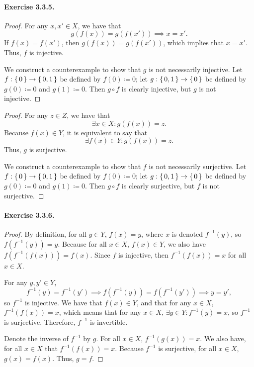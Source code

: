 \paragraph{Exercise 3.3.5.}
\begin{proof}
    For any $x,x'\in X$, we have that \[ g(f(x))=g(f(x')) \implies x = x' .\] If $f(x)=f(x')$, then $g(f(x))=g(f(x'))$, which implies that $x=x'$. Thus, $f$ is injective. 
    
    We construct a counterexample to show that $g$ is not necessarily injective. Let $f:\set{0}\to\set{0,1}$ be defined by $f(0)\coloneq{0}$; let $g:\set{0,1}\to\set{0}$ be defined by $g(0)\coloneq{0}$ and $g(1)\coloneq{0}$. Then $g\circ f$ is clearly injective, but $g$ is not injective.
\end{proof}
\begin{proof}
    For any $z\in Z$, we have that \[ \exists x\in X : g(f(x))=z .\] Because $f(x)\in Y$, it is equivalent to say that \[ \exists f(x)\in Y : g(f(x))=z .\] Thus, $g$ is surjective.

    We construct a counterexample to show that $f$ is not necessarily surjective. Let $f:\set{0}\to\set{0,1}$ be defined by $f(0)\coloneq{0}$; let $g:\set{0,1}\to\set{0}$ be defined by $g(0)\coloneq{0}$ and $g(1)\coloneq{0}$. Then $g\circ f$ is clearly surjective, but $f$ is not surjective.
\end{proof}

\paragraph{Exercise 3.3.6.}
\begin{proof}
    By definition, for all $y\in Y$, $f(x)=y$, where $x$ is denoted $f^{-1}(y)$, so $f(f^{-1}(y))=y$. Because for all $x\in X$, $f(x)\in Y$, we also have $f(f^{-1}(f(x)))=f(x)$. Since $f$ is injective, then $f^{-1}(f(x))=x$ for all $x\in X$.

    For any $y,y'\in Y$, \[f^{-1}(y)=f^{-1}(y') \implies f(f^{-1}(y))=f(f^{-1}(y'))\implies y=y',\] so $f^{-1}$ is injective. We have that $f(x)\in Y$, and that for any $x\in X$, $f^{-1}(f(x)) = x$, which means that for any $x\in X$, $\exists y\in Y : f^{-1}(y)=x$, so $f^{-1}$ is surjective. Therefore, $f^{-1}$ is invertible.

    Denote the inverse of $f^{-1}$ by $g$. For all $x\in X$, $f^{-1}(g(x))=x$. We also have, for all $x\in X$ that $f^{-1}(f(x))=x$. Because $f^{-1}$ is surjective, for all $x\in X$, $g(x)=f(x)$. Thus, $g=f$.
\end{proof}


